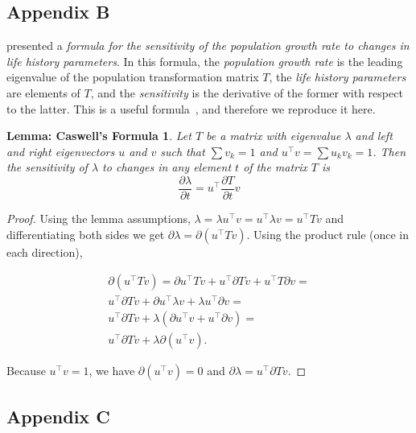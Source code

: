 \documentclass[9pt, a4paper, twocolumn]{extarticle}   	%
\newcommand*{\tr}{^\intercal}
\newtheorem*{caswell}{Lemma: Caswell's Formula}
\begin{document}
\subsection*{Appendix B}\label{sec:AppB}

\citet{Caswell1978} presented a \emph{formula for the sensitivity of the population growth rate to changes in life history parameters}.
In this formula, the \emph{population growth rate} is the leading eigenvalue of the population transformation matrix $T$, the \emph{life history parameters} are elements of $T$, and the \emph{sensitivity} is the derivative of the former with respect to the latter.
This is a useful formula~\citep{Hermisson2002,Ram2012}, and therefore we reproduce it here.

\begin{caswell}
Let $T$ be a matrix with eigenvalue $\lambda$ and left and right eigenvectors $u$ and $v$ such that $\sum{v_k}=1$ and $u\tr v = \sum{u_k v_k} = 1$.
Then the sensitivity of $\lambda$ to changes in any element $t$ of the matrix $T$ is
\begin{equation}\label{eq:Caswells_formula}
\frac{\partial \lambda}{\partial t} = 
u\tr \frac{\partial T}{\partial t} v
\end{equation}
\end{caswell}

\begin{proof} 
Using the lemma assumptions,
$\lambda = \lambda u\tr v = u\tr \lambda v = u\tr T v$ and differentiating both sides we get $\partial \lambda = \partial (u\tr T v)$.
Using the product rule (once in each direction),

\begin{multline}
\partial (u\tr T v) = 
\partial u\tr T v + u\tr \partial T v + u\tr T \partial v = \\
u\tr \partial T v + \partial u\tr \lambda v  + \lambda u\tr \partial v = \\
u\tr \partial T v + \lambda(\partial u\tr v  + u\tr \partial v) = \\
u\tr \partial T v + \lambda \partial(u\tr v).
\end{multline}

Because $u\tr v = 1$,
we have $\partial (u\tr v) = 0$ and
$\partial \lambda = u\tr \partial T v$.
\end{proof}

\subsection*{Appendix C}\label{sec:AppC}
\end{document}
